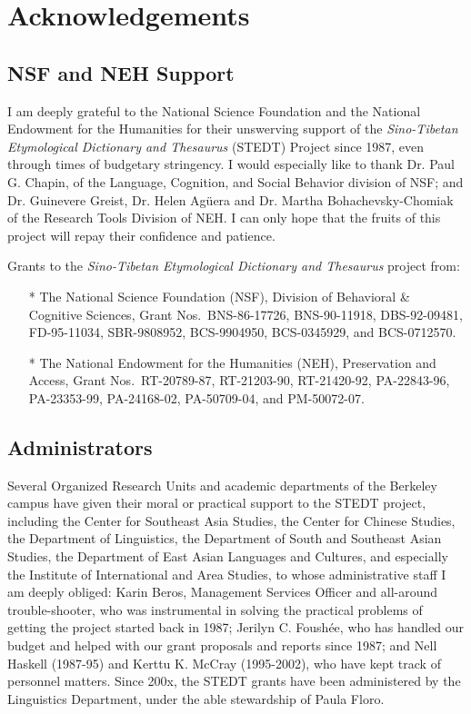 \vspace{0.25em}

\chapter*{Acknowledgements}

\renewcommand{\thefootnote}{\arabic{footnote}}
\setcounter{footnote}{0}

\section{NSF and NEH Support}

I am deeply grateful to the National Science Foundation and the National Endowment for the Humanities for their unswerving support of the {\it Sino-Tibetan Etymological Dictionary and Thesaurus} (STEDT) Project since 1987, even through times of budgetary stringency. I would especially like to thank Dr. Paul G. Chapin, of the Language, Cognition, and Social Behavior division of NSF; and Dr. Guinevere Greist, Dr. Helen Ag\"uera and Dr. Martha Bohachevsky-Chomiak of the Research Tools Division of NEH. I can only hope that the fruits of this project will repay their confidence and patience.

Grants to the \textit{Sino-Tibetan Etymological Dictionary and Thesaurus} project from:

\begin{itemize}
\item[*] The National Science Foundation (NSF), Division of
  Behavioral \& Cognitive Sciences, Grant Nos.\ BNS-86-17726,
  BNS-90-11918, DBS-92-09481, FD-95-11034, SBR-9808952,
  BCS-9904950, BCS-0345929, and BCS-0712570.
\item[*] The National Endowment for the Humanities (NEH),
  Preservation and Access, Grant Nos.\ RT-20789-87, RT-21203-90,
  RT-21420-92, PA-22843-96, PA-23353-99, PA-24168-02,
  PA-50709-04, and PM-50072-07.
\end{itemize}

\section{Administrators}

Several Organized Research Units and academic departments of the Berkeley campus have given their moral or practical support to the STEDT project, including the Center for Southeast Asia Studies, the Center for Chinese Studies, the Department of Linguistics, the Department of South and Southeast Asian Studies, the Department of East Asian Languages and Cultures, and especially the Institute of International and Area Studies, to whose administrative staff I am deeply obliged: Karin Beros, Management Services Officer and all-around trouble-shooter, who was instrumental in solving the practical problems of getting the project started back in 1987; Jerilyn C. Foush\'ee, who has handled our budget and helped with our grant proposals and reports since 1987; and Nell Haskell (1987-95) and Kerttu K. McCray (1995-2002), who have kept track of personnel matters.  Since 200x, the STEDT grants have been administered by the Linguistics Department, under the able stewardship of Paula Floro.

